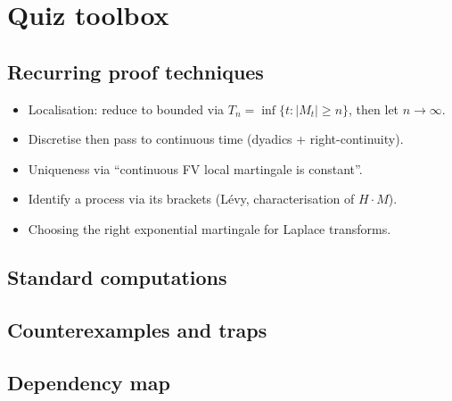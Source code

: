 \section{Quiz toolbox}
\subsection{Recurring proof techniques}
\begin{itemize}
  \item Localisation: reduce to bounded via $T_n=\inf\{t:|M_t|\ge n\}$, then let $n\to\infty$. 
  \item Discretise then pass to continuous time (dyadics + right-continuity). \todo{}
  \item Uniqueness via ``continuous FV local martingale is constant''. \todo{}
  \item Identify a process via its brackets (Lévy, characterisation of $H\cdot M$). \todo{}
  \item Choosing the right exponential martingale for Laplace transforms. \todo{}
\end{itemize}
\subsection{Standard computations}
\subsection{Counterexamples and traps}
\subsection{Dependency map}
